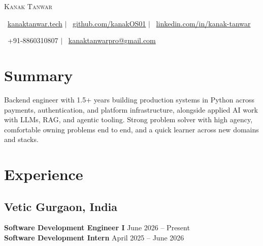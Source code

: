 \documentclass[a4paper,11pt]{article}
\begin{document}
\pagestyle{empty}

\vspace*{\fill}
\vspace{-10mm}
\begin{center}
    {\Huge\scshape Kanak Tanwar}

    \vspace{0.01em}
    \faGlobe\ \href{https://kanaktanwar.tech}{kanaktanwar.tech} $\vert$
    \faGithub\ \href{https://github.com/kanakOS01}{github.com/kanakOS01} $\vert$
    \faLinkedin\ \href{https://www.linkedin.com/in/kanak-tanwar/}{linkedin.com/in/kanak-tanwar}

    \faPhone\ +91-8860310807 $\vert$
    \faEnvelope\ \href{mailto:kanaktanwarpro@gmail.com}{kanaktanwarpro@gmail.com}
\end{center}
\vspace{-8mm}

\section*{Summary}
\vspace{-1mm}
\noindent Backend engineer with 1.5+ years building production systems in Python across payments, authentication,
and platform infrastructure, alongside applied AI work with LLMs, RAG, and agentic tooling. Strong problem solver
with high agency, comfortable owning problems end to end, and a quick learner across new domains and stacks.
\vspace{-4mm}

\section*{Experience}
\vspace{-2mm}

\subsection*{Vetic \hfill \textnormal{Gurgaon, India}}
\noindent\textbf{Software Development Engineer I} \hfill June 2026 -- Present\\
\noindent\textbf{Software Development Intern} \hfill April 2025 -- June 2026
\end{document}
